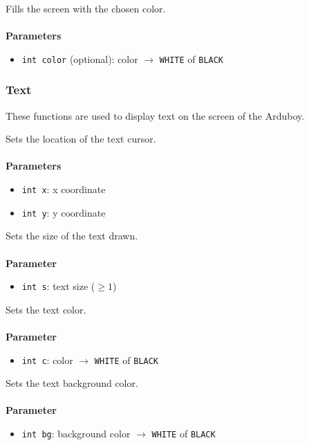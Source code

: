 \documentclass[11pt,fleqn]{book} %
\begin{document}
\begin{libf}[fillScreen(\emph{color=WHITE})]
	Fills the screen with the chosen color.\\ \\
	\textbf{Parameters}
	\begin{itemize}
		\item \texttt{int color} (optional): color $\rightarrow$ \texttt{WHITE} of \texttt{BLACK}
	\end{itemize}
\end{libf}

\subsubsection{Text}
These functions are used to display text on the screen of the Arduboy.

\begin{libf}[setCursor(x, y)]
	Sets the location of the text cursor.\\ \\
	\textbf{Parameters}
	\begin{itemize}
		\item \texttt{int x}: x coordinate
		\item \texttt{int y}: y coordinate
	\end{itemize}
\end{libf}

\begin{libf}[setTextSize(s)]
	Sets the size of the text drawn.\\ \\
	\textbf{Parameter}
	\begin{itemize}
		\item \texttt{int s}: text size ($\geq 1$)
	\end{itemize}
\end{libf}

\begin{libf}[setTextColor(c)]
	Sets the text color.\\ \\
	\textbf{Parameter}
	\begin{itemize}
		\item \texttt{int c}: color $\rightarrow$ \texttt{WHITE} of \texttt{BLACK}
	\end{itemize}
\end{libf}

\begin{libf}[setTextBackground(bg)]
	Sets the text background color.\\ \\
	\textbf{Parameter}
	\begin{itemize}
		\item \texttt{int bg}: background color $\rightarrow$ \texttt{WHITE} of \texttt{BLACK}
	\end{itemize}
\end{libf}
\end{document}
